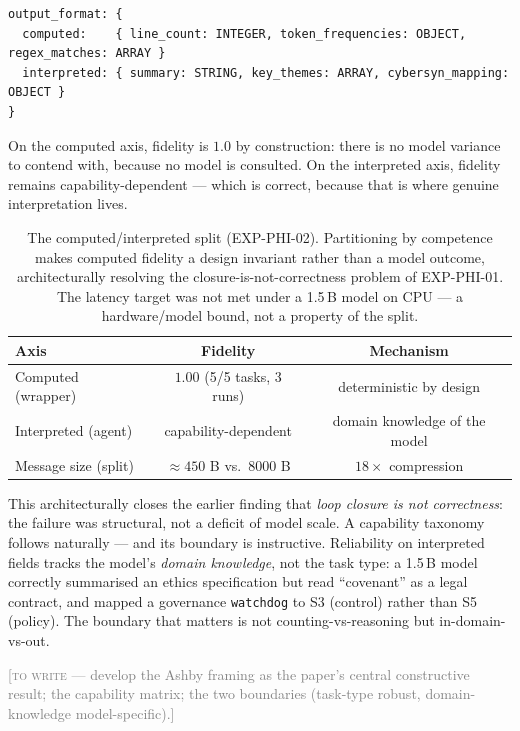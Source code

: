 \documentclass[12pt]{article}
\newcommand{\TODO}[1]{\medskip\noindent\textcolor{gray}{\small[\textsc{to write} --- #1]}\medskip}
\begin{document}
\begin{lstlisting}
output_format: {
  computed:    { line_count: INTEGER, token_frequencies: OBJECT, regex_matches: ARRAY }
  interpreted: { summary: STRING, key_themes: ARRAY, cybersyn_mapping: OBJECT }
}
\end{lstlisting}

On the computed axis, fidelity is $1.0$ by construction: there is no model variance to
contend with, because no model is consulted. On the interpreted axis, fidelity remains
capability-dependent --- which is correct, because that is where genuine interpretation
lives.

\begin{table}[!htb]
\centering
\begin{tabular}{lcc}
\toprule
Axis & Fidelity & Mechanism \\
\midrule
Computed (wrapper)     & $1.00$ (5/5 tasks, 3 runs) & deterministic by design \\
Interpreted (agent)    & capability-dependent        & domain knowledge of the model \\
\midrule
Message size (split)   & $\approx 450$ B vs.\ $8000$ B & $18\times$ compression \\
\bottomrule
\end{tabular}
\caption{The computed/interpreted split (EXP-PHI-02). Partitioning by competence makes
computed fidelity a design invariant rather than a model outcome, architecturally
resolving the closure-is-not-correctness problem of EXP-PHI-01. The latency target was
not met under a 1.5\,B model on CPU --- a hardware/model bound, not a property of the
split.}
\label{tab:split}
\end{table}

This architecturally closes the earlier finding that \emph{loop closure is not
correctness}: the failure was structural, not a deficit of model scale. A capability
taxonomy follows naturally --- and its boundary is instructive. Reliability on
interpreted fields tracks the model's \emph{domain knowledge}, not the task type: a
1.5\,B model correctly summarised an ethics specification but read ``covenant'' as a
legal contract, and mapped a governance \texttt{watchdog} to S3 (control) rather than S5
(policy). The boundary that matters is not counting-vs-reasoning but in-domain-vs-out.

\TODO{develop the Ashby framing as the paper's central constructive result; the
capability matrix; the two boundaries (task-type robust, domain-knowledge model-specific).}
\end{document}
